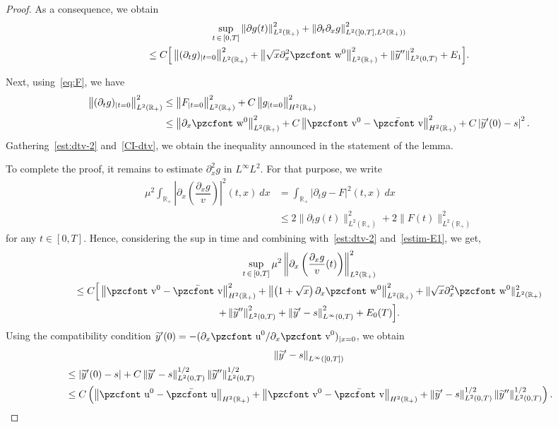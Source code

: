 \documentclass[10pt]{amsart}
\theoremstyle{definition}\newtheorem{defi}[theo]{Definition}\newtheorem{rema}[theo]{Remark}\newtheorem{exam}[theo]{Example}\newtheorem{exem}[theo]{Example}\newtheorem{nota}[theo]{Notation}
\newcommand{\mathpzc}[1]{\text{\pzcfont #1}}
\newcommand{\R}{\mathbb{R}}
\newcommand{\p}{\partial}
\newcommand{\bv}{\bar{\mathpzc{v}}}
\newcommand{\bu}{\bar{\mathpzc{u}}}
\newcommand{\tv}{\mathpzc{v}}
\newcommand{\tu}{\mathpzc{u}}
\newcommand{\tw}{\mathpzc{w}}
\newcommand{\ty}{\widetilde{y}}
\begin{document}
\begin{proof}
As a consequence, we obtain
\begin{multline}\label{est:dtv-2}
\sup_{t\, \in\,[0,T]} \left\|\partial g(t)\right\|_{L^2(\R_+)}^2 + \left\|\partial_t \partial_xg\right\|_{L^2\left([0,T],L^2(\R_+)\right)}^2 
\\
\leq C\Big[\left\|(\partial_tg)_{|t=0}\right\|_{L^2(\R_+)}^2 +\left\| \sqrt{x}\partial^2_x \tw^0\right\|_{L^2(\R_+)}^2 + \left\|\ty''\right\|_{L^2(0,T)}^2 + E_1\Big].
\end{multline}

Next, using~\eqref{eq:F}, we have
\begin{equation}\label{CI-dtv}
\begin{split}
\left\|(\partial_tg)_{|t=0}\right\|_{L^2(\R_+)}^2 & \leq \left\|F_{|t=0}\right\|_{L^2(\R_+)}^2 + C\left\|g_{|t=0}\right\|_{H^2(\R_+)}^2 \\
&\leq \left\|\p_x \tw^0\right\|_{L^2(\R_+)}^2 + C \left\|\tv^0 - \bv\right\|_{H^2(\R_+)}^2 + C \left|\ty'(0) -s\right|^2.
\end{split}
\end{equation}
Gathering~\eqref{est:dtv-2} and~\eqref{CI-dtv}, we obtain the inequality announced in the statement of the lemma.


To complete the proof, it remains to estimate $\partial^2_x g$ in $L^\infty L^2$. For that purpose, we write
\begin{align*}
\mu^2 \int_{\R_+} \left|\partial_x\left(\dfrac{\partial_xg}{v} \right)\right|^2(t,x)\:dx & = \int_{\R_+} |\partial_t g - F|^2(t,x)\:dx \\
& \leq 2 \|\partial_tg(t)\|_{L^2(\R_+)}^2 + 2 \|F(t)\|_{L^2(\R_+)}^2
\end{align*}
for any $t \in [0,T]$. Hence, considering the sup in time and combining with~\eqref{est:dtv-2} and~\eqref{estim-E1}, we get,
\begin{multline*}
\sup_{t\, \in\,[0,T]} \mu^2 \left\|\partial_x\left(\dfrac{\partial_xg }{v}(t) \right)\right\|_{L^2(\R_+)}^2 \\
\leq C\Big[\left\|\tv^0 - \bv\right\|_{H^2(\R_+)}^2 + \left\|\left(1+\sqrt{x}\right) \partial_x \tw^0\right\|_{L^2(\R_+) }^2 + \|\sqrt{x} \partial^2_x \tw^0\|_{L^2(\R_+)}^2 \\
+ \left\|\ty''\right\|_{L^2(0,T)}^2+ \left\|\ty'-s\right\|_{L^\infty(0,T)}^2 + E_0 (T) \Big].
\end{multline*}
Using the compatibility condition $\ty'(0)=-(\p_x \tu^0/\p_x \tv^0)_{|x=0}$, we obtain
\begin{multline}\label{est:b-infty}
\left\|\ty'-s\right\|_{L^\infty([0,T])}\\
\begin{aligned}
&\leq \left|\ty'(0)-s\right| + C\left\|\ty'-s\right\|_{L^2(0,T)}^{1/2} \left\|\ty''\right\|_{L^2(0,T)}^{1/2}\\
&\leq C\left(\left\|\tu^0-\bu\right\|_{H^2(\R_+)} +\left\|\tv^0-\bv\right\|_{H^2(\R_+)}+ \left\|\ty'-s\right\|_{L^2(0,T)}^{1/2} \left\|\ty''\right\|_{L^2(0,T)}^{1/2}\right).
\end{aligned}
\end{multline}


\end{proof}
\end{document}
